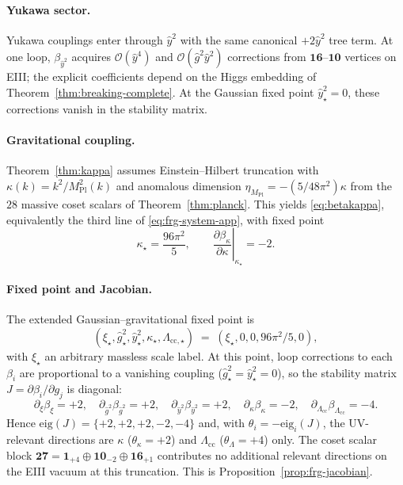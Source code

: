 \documentclass[11pt]{article}
\theoremstyle{plain}
\theoremstyle{definition}
\theoremstyle{remark}
\numberwithin{equation}{section}
\newcommand{\MPl}{M_{\mathrm{Pl}}}
\begin{document}
\paragraph{Yukawa sector.}
Yukawa couplings enter through $\hat y^2$ with the same canonical $+2\hat y^2$
tree term. At one loop, $\beta_{\hat y^2}$ acquires $\mathcal{O}(\hat y^4)$ and
$\mathcal{O}(\hat g^2\hat y^2)$ corrections from $\mathbf{16}$--$\mathbf{10}$
vertices on EIII; the explicit coefficients depend on the Higgs embedding of
Theorem~\ref{thm:breaking-complete}. At the Gaussian fixed point
$\hat y^2_\star=0$, these corrections vanish in the stability matrix.

\paragraph{Gravitational coupling.}
Theorem~\ref{thm:kappa} assumes Einstein--Hilbert truncation with
$\kappa(k)=k^2/\MPl^2(k)$ and anomalous dimension
$\eta_{\MPl}=-(5/48\pi^2)\kappa$ from the $28$ massive coset scalars of
Theorem~\ref{thm:planck}. This yields \eqref{eq:betakappa}, equivalently the
third line of \eqref{eq:frg-system-app}, with fixed point
\begin{equation}\label{eq:kappa-star}
  \kappa_\star=\frac{96\pi^2}{5},
  \qquad
  \left.\frac{\partial\beta_\kappa}{\partial\kappa}\right|_{\kappa_\star}=-2.
\end{equation}

\paragraph{Fixed point and Jacobian.}
The extended Gaussian--gravitational fixed point is
\begin{equation}\label{eq:frg-fp}
  (\xi_\star,\hat g^2_\star,\hat y^2_\star,\kappa_\star,\Lambda_{\mathrm{cc},\star})
  \;=\;
  (\xi_\star,0,0,96\pi^2/5,0),
\end{equation}
with $\xi_\star$ an arbitrary massless scale label. At this point, loop
corrections to each $\beta_i$ are proportional to a vanishing coupling
($\hat g^2_\star=\hat y^2_\star=0$), so the stability matrix
$J=\partial\beta_i/\partial g_j$ is diagonal:
\begin{equation}\label{eq:jacobian-diag}
  \partial_{\xi}\beta_{\xi}=+2,\quad
  \partial_{\hat g^2}\beta_{\hat g^2}=+2,\quad
  \partial_{\hat y^2}\beta_{\hat y^2}=+2,\quad
  \partial_{\kappa}\beta_{\kappa}=-2,\quad
  \partial_{\Lambda_{\mathrm{cc}}}\beta_{\Lambda_{\mathrm{cc}}}=-4.
\end{equation}
Hence $\mathrm{eig}(J)=\{+2,+2,+2,-2,-4\}$ and, with
$\theta_i=-\mathrm{eig}_i(J)$, the UV-relevant directions are $\kappa$
($\theta_\kappa=+2$) and $\Lambda_{\mathrm{cc}}$ ($\theta_{\Lambda}=+4$) only.
The coset scalar block
$\mathbf{27}=\mathbf{1}_{+4}\oplus\mathbf{10}_{-2}\oplus\mathbf{16}_{+1}$
contributes no additional relevant directions on the EIII vacuum at this
truncation. This is Proposition~\ref{prop:frg-jacobian}.
\end{document}
